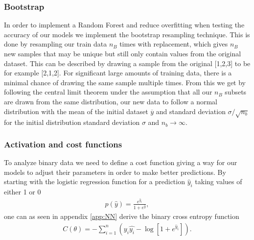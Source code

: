 \documentclass[11pt]{article}
\begin{document}
\subsubsection*{Bootstrap}

In order to implement a Random Forest and reduce overfitting when testing the accuracy of our models we implement the bootstrap resampling technique. This is done by resampling our train data $n_B$ times with replacement, which gives $n_B$ new samples that may be unique but still only contain values from the original dataset. This can be described by drawing a sample from the original [1,2,3] to be for example [2,1,2]. For significant large amounts of training data, there is a minimal chance of drawing the same sample multiple times. From this we get by following the central limit theorem under the assumption that all our $n_B$ subsets are drawn from the same distribution, our new data to follow a normal distribution with the mean of the initial dataset $\overline{y}$ and standard deviation $\sigma/\sqrt{n_b}$ for the initial distribution standard deviation $\sigma$ and $n_b \rightarrow \infty$.
\subsubsection*{Activation and cost functions}
To analyze binary data we need to define a cost function giving a way for our models to adjust their parameters in order to make better predictions. By starting with the logistic regression function for a prediction $\hat{y}_i$ taking values of either 1 or 0
\begin{align*}
    p(\hat{y}) = \frac{e^{\hat{y}_i}}{1 + e^{\hat{y}}},
\end{align*}
one can as seen in appendix \ref{app:NN} derive the binary cross entropy function
\begin{align*}
    C(\theta) = - \sum_{i=1}^n (y_i\hat{y_i} - \log[1+ e^{\hat{y}_i}]).
\end{align*}
\end{document}

